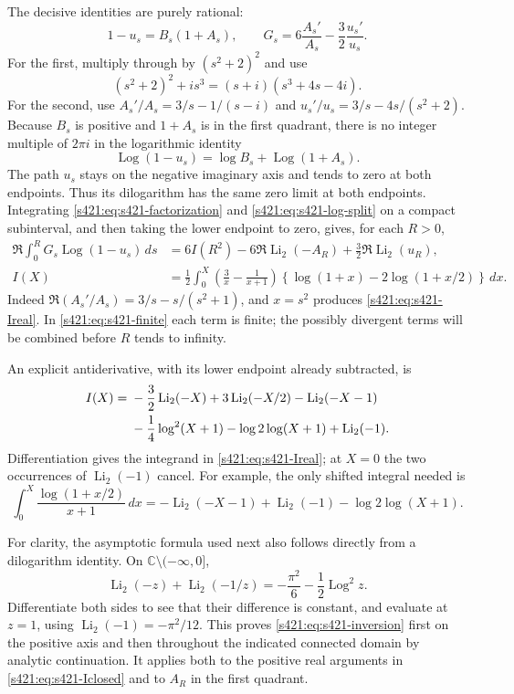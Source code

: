 \documentclass[11pt,a4paper]{article}
\theoremstyle{remark}\newtheorem{remark}[theorem]{Remark}
\numberwithin{equation}{section}
\begin{document}
The decisive identities are purely rational:
\begin{equation}\label{s421:eq:s421-factorization}
 1-u_s=B_s(1+A_s),\qquad
 G_s=6\frac{A_s'}{A_s}-\frac32\frac{u_s'}{u_s}.
\end{equation}
For the first, multiply through by $(s^2+2)^2$ and use
\[
 (s^2+2)^2+i s^3=(s+i)(s^3+4s-4i).
\]
For the second, use
$A_s'/A_s=3/s-1/(s-i)$ and
$u_s'/u_s=3/s-4s/(s^2+2)$.
Because $B_s$ is positive and $1+A_s$ is in the first quadrant,
there is no integer multiple of $2\pi i$ in the logarithmic identity
\begin{equation}\label{s421:eq:s421-log-split}
 \operatorname{Log}(1-u_s)=\log B_s+\operatorname{Log}(1+A_s).
\end{equation}
The path $u_s$ stays on the negative imaginary axis and tends to zero
at both endpoints. Thus its dilogarithm has the same zero limit at
both endpoints. Integrating \eqref{s421:eq:s421-factorization} and
\eqref{s421:eq:s421-log-split} on a compact subinterval, and then taking
the lower endpoint to zero, gives, for each $R>0$,
\begin{align}
 \Re\int_0^R G_s\operatorname{Log}(1-u_s)\,ds
 &=6I(R^2)-6\Re\operatorname{Li}_2(-A_R)
   +\tfrac32\Re\operatorname{Li}_2(u_R),\label{s421:eq:s421-finite}\\
 I(X)&=\frac12\int_0^X
 \left(\frac3x-\frac1{x+1}\right)
 \left\{\log(1+x)-2\log(1+x/2)\right\}\,dx.
 \label{s421:eq:s421-Ireal}
\end{align}
Indeed $\Re(A_s'/A_s)=3/s-s/(s^2+1)$, and $x=s^2$ produces
\eqref{s421:eq:s421-Ireal}. In \eqref{s421:eq:s421-finite} each term is finite;
the possibly divergent terms will be combined before $R$ tends to
infinity.

An explicit antiderivative, with its lower endpoint already subtracted,
is
\begin{align}
 I(X)={}&-\frac32\operatorname{Li}_2(-X)
       +3\operatorname{Li}_2(-X/2)
       -\operatorname{Li}_2(-X-1)\notag\\
 &-\frac14\log^2(X+1)-\log2\log(X+1)
       +\operatorname{Li}_2(-1).\label{s421:eq:s421-Iclosed}
\end{align}
Differentiation gives the integrand in \eqref{s421:eq:s421-Ireal}; at
$X=0$ the two occurrences of $\operatorname{Li}_2(-1)$ cancel.
For example, the only shifted integral needed is
\[
 \int_0^X\frac{\log(1+x/2)}{x+1}\,dx
 =-\operatorname{Li}_2(-X-1)+\operatorname{Li}_2(-1)
  -\log2\log(X+1).
\]

For clarity, the asymptotic formula used next also follows directly
from a dilogarithm identity. On $\mathbb C\setminus(-\infty,0]$,
\begin{equation}\label{s421:eq:s421-inversion}
 \operatorname{Li}_2(-z)+\operatorname{Li}_2(-1/z)
 =-\frac{\pi^2}{6}-\frac12\operatorname{Log}^2 z.
\end{equation}
Differentiate both sides to see that their difference is constant,
and evaluate at $z=1$, using
$\operatorname{Li}_2(-1)=-\pi^2/12$.
This proves \eqref{s421:eq:s421-inversion} first on the positive axis and
then throughout the indicated connected domain by analytic continuation.
It applies both to the positive real arguments in
\eqref{s421:eq:s421-Iclosed} and to $A_R$ in the first quadrant.
\end{document}
